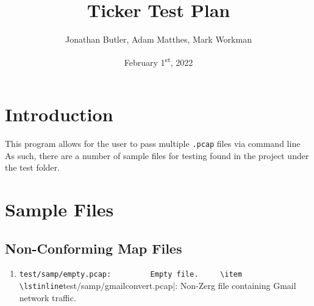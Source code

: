 \documentclass[12pt]{article}
\title{Ticker Test Plan}
\author{Jonathan Butler, Adam Matthes, Mark Workman}
\date{February 1\textsuperscript{st}, 2022}
\begin{document}
\maketitle
\section{Introduction}

 This program allows for the user to pass multiple \lstinline|.pcap| files via command line As such, there are a number of sample files for testing found in the project under the test folder.

\section{Sample Files}
\subsection{Non-Conforming Map Files}
\hspace{8pt}
\begin{enumerate}
    \item \lstinline|test/samp/empty.pcap:
        Empty file.
    \item \lstinline|test/samp/gmailconvert.pcap|:
        Non-Zerg file containing Gmail network traffic.
\end{enumerate}
\end{document}
